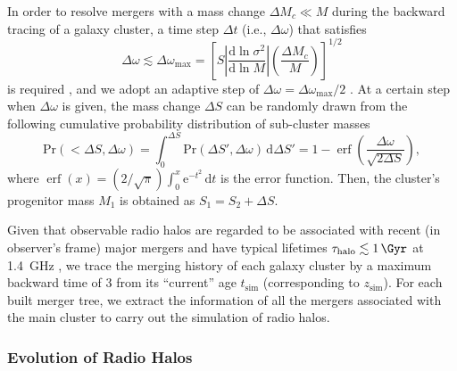 \documentclass[modern]{aastex62}
\newcommand{\R}[1]{\mathrm{#1}}
\newcommand{\D}[1]{\R{d} #1}
\newcommand{\diff}[2]{\frac{\D{#1}}{\D{#2}}}
\DeclareMathOperator{\erf}{erf}
\begin{document}
In order to resolve mergers with a mass change $\Delta M_c \ll M$
during the backward tracing of a galaxy cluster, a time step $\Delta t$
(i.e., $\Delta\omega$) that satisfies
\begin{equation}
  \label{sec:dw-step}
  \Delta\omega \lesssim \Delta\omega_{\R{max}} = \left[
    S \left| \diff{\ln \sigma^2}{\ln M} \right|
    \left( \frac{\Delta M_c}{M} \right) \right]^{1/2}
\end{equation}
is required \citep{lacey1993}, and we adopt an adaptive step of
$\Delta\omega = \Delta\omega_{\R{max}} / 2$ \citep{randall2002}.
At a certain step when $\Delta\omega$ is given, the mass change
$\Delta S$ can be randomly drawn from the following cumulative
probability distribution of sub-cluster masses
\begin{equation}
  \label{sec:cdf-sub-masses}
  \R{Pr}(<\!\Delta S, \Delta\omega)
    = \int_0^{\Delta S} \R{Pr}(\Delta S', \Delta\omega) \,\D{\Delta S'}
    = 1 - \erf \!\left( \frac{\Delta \omega}{\sqrt{2 \Delta S}} \right),
\end{equation}
where
$\erf(x) = (2/\sqrt{\pi}) \int_0^x \R{e}^{-t^2} \,\D{t}$
is the error function.
Then, the cluster's progenitor mass $M_1$ is obtained as
$S_1 = S_2 + \Delta S$.

Given that observable radio halos are regarded to be associated
with recent (in observer's frame) major mergers
and have typical lifetimes $\tau_{\R{halo}} \lesssim \SI{1}{\Gyr}$
at \SI{1.4}{\GHz} \citep[e.g.,][]{brunetti2009,cassano2016},
we trace the merging history of each galaxy cluster by a maximum
backward time of \SI{3}{\Gyr} from its \enquote{current} age
$t_{\R{sim}}$ (corresponding to $z_{\R{sim}}$).
For each built merger tree, we extract the information of all
the mergers associated with the main cluster to carry out the
simulation of radio halos.


\subsubsection{Evolution of Radio Halos}
\label{sec:halos}
\end{document}
